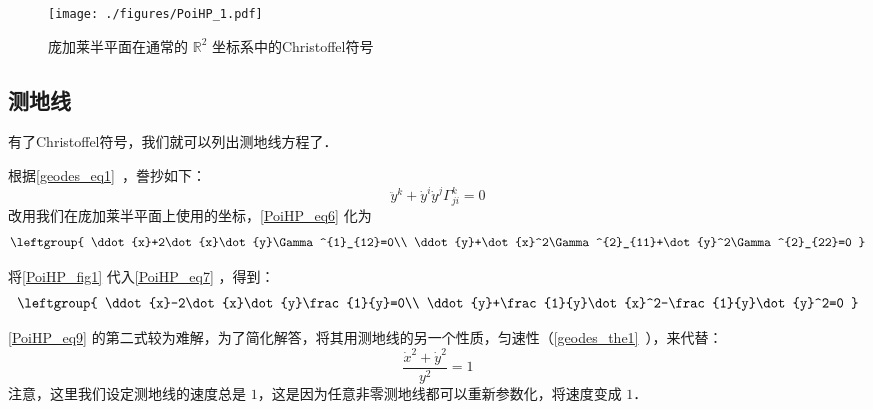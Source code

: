 \begin{figure}[ht]
\centering
\texttt{[image: ./figures/PoiHP\_1.pdf]}
\caption{庞加莱半平面在通常的 $\mathbb{R}^2$ 坐标系中的Christoffel符号} \label{PoiHP_fig1}
\end{figure}


\subsection{测地线}


有了Christoffel符号，我们就可以列出测地线方程了．

根据\autoref{geodes_eq1}~，誊抄如下：
\begin{equation}\label{PoiHP_eq6}
\ddot{y}^k+\dot{y}^i\dot{y}^j\Gamma^k_{ji}=0
\end{equation}
改用我们在庞加莱半平面上使用的坐标，\autoref{PoiHP_eq6} 化为
\begin{equation}\label{PoiHP_eq7}
\leftgroup{
    \ddot{x}+2\dot{x}\dot{y}\Gamma^{1}_{12}=0\\
    \ddot{y}+\dot{x}^2\Gamma^{2}_{11}+\dot{y}^2\Gamma^{2}_{22}=0
}
\end{equation}

将\autoref{PoiHP_fig1} 代入\autoref{PoiHP_eq7} ，得到：
\begin{equation}\label{PoiHP_eq9}
\leftgroup{
    \ddot{x}-2\dot{x}\dot{y}\frac{1}{y}=0\\
    \ddot{y}+\frac{1}{y}\dot{x}^2-\frac{1}{y}\dot{y}^2=0
}
\end{equation}

\autoref{PoiHP_eq9} 的第二式较为难解，为了简化解答，将其用测地线的另一个性质，匀速性（\autoref{geodes_the1}~），来代替：
\begin{equation}\label{PoiHP_eq8}
\frac{\dot{x}^2+\dot{y}^2}{y^2}=1
\end{equation}
注意，这里我们设定测地线的速度总是 $1$，这是因为任意非零测地线都可以重新参数化，将速度变成 $1$．


